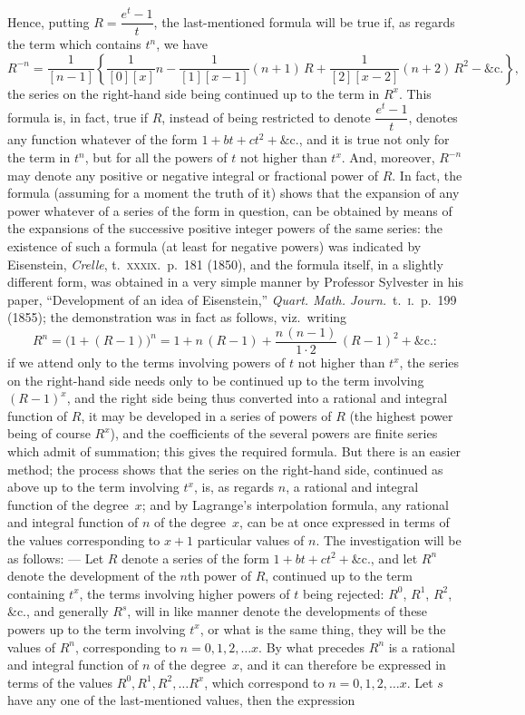 \documentclass[11pt]{article}
\begin{document}
\noindent Hence, putting $R = \dfrac{e^t - 1}{t}$, the last-mentioned formula will be true if, as regards the term which contains $t^n$, we have
\[
   R^{-n} = \frac{1}{[n-1]}\left\{\frac{1}{[0][x]}n - \frac{1}{[1][x-1]}(n+1)\,R + \frac{1}{[2][x-2]}(n+2)\,R^2 - \&\text{c.}\right\},
\]
the series on the right-hand side being continued up to the term in $R^x$. This formula is, in fact, true if $R$, instead of being restricted to denote $\dfrac{e^t - 1}{t}$, denotes any function whatever of the form $1 + b t + c t^2 + \&\text{c.}$, and it is true not only for the term in $t^n$, but for all the powers of $t$ not higher than $t^x$. And, moreover, $R^{-n}$ may denote any positive or negative integral or fractional power of $R$. In fact, the formula (assuming for a moment the truth of it) shows that the expansion of any power whatever of a series of the form in question, can be obtained by means of the expansions of the successive positive integer powers of the same series: the existence of such a formula (at least for negative powers) was indicated by Eisenstein, \textit{Crelle}, t.~\textsc{xxxix.}\ p.~181 (1850), and the formula itself, in a slightly different form, was obtained in a very simple manner by Professor Sylvester in his paper, ``Development of an idea of Eisenstein,'' \textit{Quart. Math. Journ.}\ t.~\textsc{i.}\ p.~199 (1855); the demonstration was in fact as follows, viz.\ writing
\[
   R^n = \bigl(1 + (R - 1)\bigr)^n = 1 + n\,(R - 1) + \frac{n\,(n - 1)}{1\cdot 2}\,(R - 1)^2 + \&\text{c.}:
\]
if we attend only to the terms involving powers of $t$ not higher than $t^x$, the series on the right-hand side needs only to be continued up to the term involving $(R - 1)^x$, and the right side being thus converted into a rational and integral function of $R$, it may be developed in a series of powers of $R$ (the highest power being of course $R^x$), and the coefficients of the several powers are finite series which admit of summation; this gives the required formula. But there is an easier method; the process shows that the series on the right-hand side, continued as above up to the term involving $t^x$, is, as regards $n$, a rational and integral function of the degree~$x$; and by Lagrange's interpolation formula, any rational and integral function of $n$ of the degree~$x$, can be at once expressed in terms of the values corresponding to $x + 1$ particular values of $n$. The investigation will be as follows: --- Let $R$ denote a series of the form $1 + b t + c t^2 + \&\text{c.}$, and let $R^n$ denote the development of the $n$th power of $R$, continued up to the term containing $t^x$, the terms involving higher powers of $t$ being rejected: $R^0$, $R^1$, $R^2$, \&c., and generally $R^s$, will in like manner denote the developments of these powers up to the term involving $t^x$, or what is the same thing, they will be the values of $R^n$, corresponding to $n = 0, 1, 2, \ldots x$. By what precedes $R^n$ is a rational and integral function of $n$ of the degree~$x$, and it can therefore be expressed in terms of the values $R^0, R^1, R^2, \ldots R^x$, which correspond to $n = 0, 1, 2, \ldots x$. Let $s$ have any one of the last-mentioned values, then the expression
\end{document}
